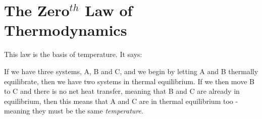 \section{The Zero$^{th}$ Law of Thermodynamics}

This law is the basis of temperature. It says:
	
	If we have three systems, A, B and C, and we begin by letting A and B
	thermally equilibrate, then we have two systems in thermal equilibrium.
	If we then move B to C and there is no net heat transfer, meaning that B
	and C are already in equilibrium, then this means that A and C are in
	thermal equilibrium too - meaning they must be the same \emph{temperature}.

